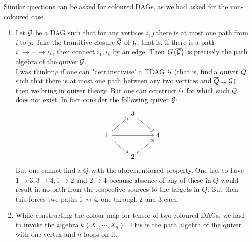 \begin{rmk}
Similar questions can be asked for coloured DAGs, as we had asked for the non-coloured case.
\end{rmk}
\begin{rmk}
\begin{enumerate}[leftmargin=*]
\item Let ${\mathcal{G}}$ be a DAG such that for any vertices $i,j$ there is at most one path from $i$ to $j$. Take the transitive closure $\overline{{\mathcal{G}}}$ of ${\mathcal{G}}$, that is, if there is a path $i_1\to\cdots\to i_k$, then connect $i_1,i_k$ by an edge. Then $G\left(\overline{{\mathcal{G}}}\right)$ is precisely the path algebra of the quiver ${\mathcal{G}}$. \\
I was thinking if one can "detransitivise" a TDAG ${\mathcal{G}}$ (that is, find a quiver $Q$ such that there is at most one path between any two vertices and $\overline{Q} = {\mathcal{G}}$) then we bring in quiver theory. But one can construct ${\mathcal{G}}$ for which such $Q$ does not exist. In fact consider the following quiver ${\mathcal{G}}$:
\[\begin{tikzcd}
	& 3 \\
	1 && 4 \\
	& 2
	\arrow[from=2-1, to=1-2]
	\arrow[from=1-2, to=2-3]
	\arrow[from=2-1, to=3-2]
	\arrow[from=3-2, to=2-3]
	\arrow[from=2-1, to=2-3]
\end{tikzcd}\]
But one cannot find a $Q$ with the aforementioned property. One has to have $1\to 3, 3\to 4, 1\to 2$ and $2\to 4$ because absence of any of these in $Q$ would result in no path from the respective sources to the targets in $\overline Q$. But then this forces two paths $1\rightsquigarrow 4$, one through $2$ and $3$ each.
\item While constructing the colour map for tensor of two coloured DAGs, we had to invoke the algebra $k\left<X_1,\cdots,X_n\right>$. This is the path algebra of the quiver with one vertex and $n$ loops on it.
\end{enumerate}
\end{rmk}
\nocite{mainpaper}
\printbibliography

%
%
\nocite{dagsnotears}
\nocite{symmetriesDAG}


